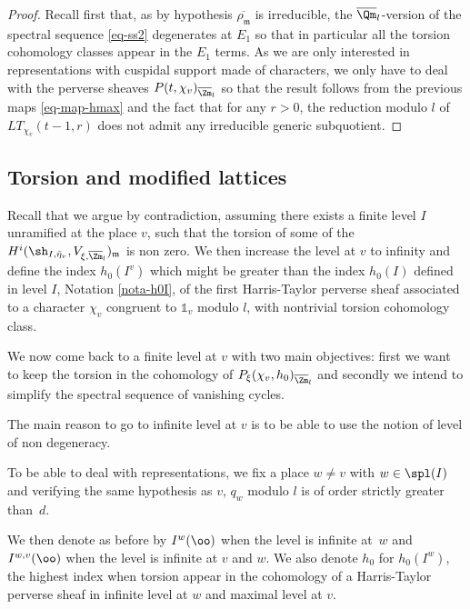 \begin{proof}
Recall first that, as by hypothesis $\overline{\rho_{\mathfrak m}}$ is irreducible, the
$\overline \Qm_l$-version of the spectral sequence \eqref{eq-ss2} degenerates at $E_1$ so
that in particular all the torsion cohomology classes appear in the $E_1$ terms.
As we are only interested in representations with cuspidal support made of characters,
we only have to deal with the perverse sheaves $P(t,\chi_v)_{\overline \Zm_l}$ so that the result
follows from the previous maps \eqref{eq-map-hmax} and the fact that for
any $r>0$, the reduction modulo $l$ of $LT_{\chi_v}(t-1,r)$ does not admit any irreducible
generic subquotient.
\end{proof}

\subsection{Torsion and modified lattices}
\label{para-modification}

Recall that we argue by contradiction, assuming there exists a finite level $I$
unramified at the place $v$, such that the torsion of some of
the $H^i(\sh_{I,\bar \eta_v},V_{\xi,\overline \Zm_l})_{\mathfrak m}$ is non
zero. We then increase the level at $v$ to infinity and define the index
$h_0(I^v)$ which might be greater than the index $h_0(I)$ defined in level $I$,
\cf Notation \ref{nota-h0I}, of the first Harris-Taylor perverse sheaf
associated to a character $\chi_v$ congruent to $\mathds 1_v$ modulo $l$,
with nontrivial torsion cohomology class.

We now come back to a finite level at $v$ with two main objectives:
first we want to keep the torsion in the cohomology of
$P_\xi(\chi_v,h_0)_{\overline \Zm_l}$ and secondly we intend to simplify the spectral sequence
of vanishing cycles.

\begin{remark}
The main reason to go to infinite level at $v$ is to be able to use
the notion of level of non degeneracy.

To be able to deal with representations, we fix a place $w \neq v$
with $w \in \spl(I)$ and verifying the
same hypothesis as $v$, \ie $q_w$ modulo $l$ is of order strictly greater than~$d$.
\end{remark}

\begin{nota}
We then denote as before by $I^w(\oo)$ when the level is infinite at~$w$ and
$I^{w,v}(\oo)$ when the level is infinite at $v$ and $w$. We also denote $h_0$
for $h_0(I^w)$, the highest index when torsion appear in the cohomology of
a Harris-Taylor perverse sheaf in infinite level at $w$ and maximal level at $v$.
\end{nota}

